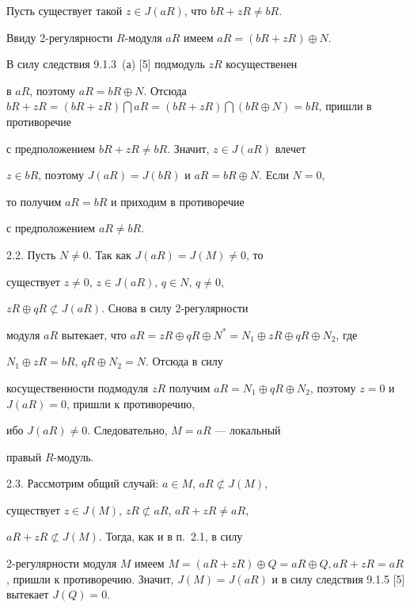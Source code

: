 Пусть существует такой $z \in J(aR)$, что $bR+zR \ne bR$.


Ввиду 2-регулярности $R$-модуля $aR$ имеем $aR=( bR+ zR ) \oplus N$.


В силу следствия 9.1.3~(а) [5] подмодуль $zR$ косущественен


в $aR$, поэтому $aR=bR \oplus N$. Отсюда $bR+zR =(bR+zR) \bigcap


aR=(bR+zR) \bigcap (bR \oplus N)=bR$, пришли в противоречие


с предположением $bR+zR \ne bR$. Значит, $z \in J(aR)$ влечет


$z \in bR$, поэтому $J(aR)=J(bR)$ и $aR=bR \oplus N$. Если $N=0$,


то получим $aR=bR$ и приходим в противоречие


с предположением $aR \ne bR$.





2.2. Пусть $N \ne 0$. Так как $J(aR)=J(M) \ne 0$, то


существует $z \ne 0$, $z \in J(aR)$, $q \in N$, $q \ne 0$,


$zR \oplus qR \not\subset J(aR)$. Снова в силу 2-регулярности


модуля $aR$ вытекает, что $aR= zR \oplus qR \oplus N^*=


N_1 \oplus zR \oplus qR \oplus N_2$, где


$N_1 \oplus zR =bR$, $qR \oplus N_2=N$. Отсюда в силу


косущественности подмодуля $zR$ получим $aR= N_1 \oplus


qR \oplus N_2$, поэтому $z=0$ и $J(aR)=0$, пришли к противоречию,


ибо $J(aR) \ne 0$. Следовательно, $M=aR$ --- локальный


правый $R$-модуль.





2.3. Рассмотрим общий случай: $a \in M$, $aR \not\subset J(M)$,


существует $z \in J(M)$, $zR \not\subset aR$, $aR+zR \ne aR$,


$aR+zR \not\subset J(M)$. Тогда, как и в п.~2.1, в силу


2-регулярности модуля $M$ имеем $M= (aR+zR) \oplus Q =


aR \oplus Q, aR+zR=aR$, пришли к противоречию. Значит, $J(M)=


J(aR)$ и в силу следствия 9.1.5 [5] вытекает $J(Q)=0$.



